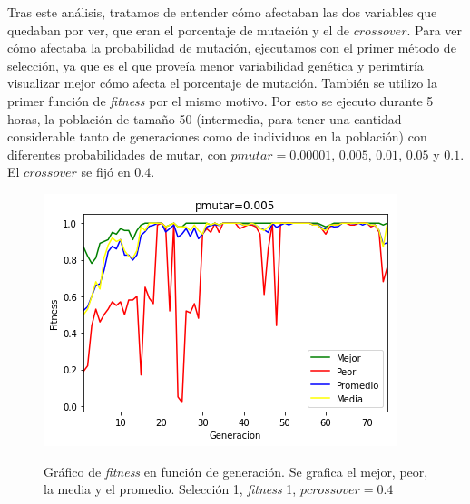 \documentclass[A4paper,oneside,fleqn,11pt]{article}
\theoremstyle{definition}
\begin{document}
Tras este análisis, tratamos de entender cómo afectaban las dos variables que quedaban por ver, que eran el porcentaje de mutación y el de $crossover$. Para ver cómo afectaba la probabilidad de mutación, ejecutamos con el primer método de selección, ya que es el que proveía menor variabilidad genética y perimtiría visualizar mejor cómo afecta el porcentaje de mutación. También se utilizo la primer función de \textit{fitness} por el mismo motivo. Por esto se ejecuto durante 5 horas, la población de tamaño 50 (intermedia, para tener una cantidad considerable tanto de generaciones como de individuos en la población) con diferentes probabilidades de mutar, con $pmutar=0.00001$, $0.005$, $0.01$, $0.05$ y $0.1$. El $crossover$ se fijó en $0.4$.


\begin{figure}[H]
	\captionsetup[subfigure]{position=b}
	\centering
		{\includegraphics[width=0.3\linewidth]{muta1.png}}
	\caption{Gráfico de \textit{fitness} en función de generación. Se grafica el mejor, peor, la media y el promedio. Selección 1, \textit{fitness} 1, $pcrossover=0.4$}
\end{figure}
\end{document}
